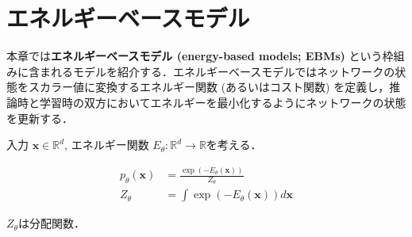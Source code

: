 \section{エネルギーベースモデル}
本章では\textbf{エネルギーベースモデル (energy-based models; EBMs)} という枠組みに含まれるモデルを紹介する．エネルギーベースモデルではネットワークの状態をスカラー値に変換するエネルギー関数 (あるいはコスト関数) を定義し，推論時と学習時の双方においてエネルギーを最小化するようにネットワークの状態を更新する．\cite{LeCun2006-dt}

入力 $\mathbf{x}\in \mathbb{R}^d$, エネルギー関数 $E_\theta: \mathbb{R}^d\to \mathbb{R}$を考える．


\begin{align}
p_\theta(\mathbf{x})&=\frac{\exp(-E_\theta(\mathbf{x}))}{Z_\theta}\\
Z_\theta &= \int \exp(-E_\theta(\mathbf{x})) d\mathbf{x}
\end{align}


$Z_\theta$は分配関数．
